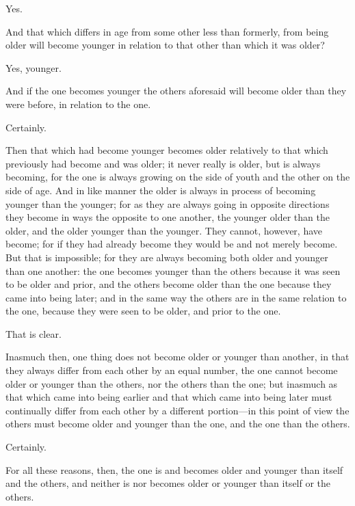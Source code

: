 \documentclass[11pt,letter]{article}
\begin{document}
\par  Yes.

\par  And that which differs in age from some other less than formerly, from being older will become younger in relation to that other than which it was older?

\par  Yes, younger.

\par  And if the one becomes younger the others aforesaid will become older than they were before, in relation to the one.

\par  Certainly.

\par  Then that which had become younger becomes older relatively to that which previously had become and was older; it never really is older, but is always becoming, for the one is always growing on the side of youth and the other on the side of age. And in like manner the older is always in process of becoming younger than the younger; for as they are always going in opposite directions they become in ways the opposite to one another, the younger older than the older, and the older younger than the younger. They cannot, however, have become; for if they had already become they would be and not merely become. But that is impossible; for they are always becoming both older and younger than one another: the one becomes younger than the others because it was seen to be older and prior, and the others become older than the one because they came into being later; and in the same way the others are in the same relation to the one, because they were seen to be older, and prior to the one.

\par  That is clear.

\par  Inasmuch then, one thing does not become older or younger than another, in that they always differ from each other by an equal number, the one cannot become older or younger than the others, nor the others than the one; but inasmuch as that which came into being earlier and that which came into being later must continually differ from each other by a different portion—in this point of view the others must become older and younger than the one, and the one than the others.

\par  Certainly.

\par  For all these reasons, then, the one is and becomes older and younger than itself and the others, and neither is nor becomes older or younger than itself or the others.
\end{document}
